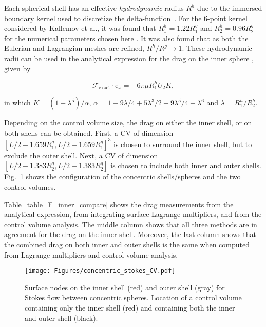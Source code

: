 \documentclass[review]{elsarticle}
\renewcommand{\vec}[1]{\bm{\mathrm{#1}}}
\def \e{\vec{e}}
\def \cF{\vec{\mathcal{F}}}
\def \e{\vec{e}}
\begin{document}
Each spherical shell has an effective \emph{hydrodynamic} radius $R^h$ due to the immersed
boundary kernel used to discretize the delta-function~\cite{Vazquez-Quesada14}.
For the 6-point kernel considered by Kallemov et al., it was found that $R_1^h = 1.22 R_1^g$
and $R_2^h = 0.96R_2^g$ for the numerical parameters chosen here \cite{Kallemov16}. It was
also found that as both the Eulerian and Lagrangian meshes are refined, $R^h/R^g \rightarrow
1$. These hydrodynamic radii can be used in the analytical expression for the drag on the 
inner sphere \cite{Happel65}, given by

\begin{equation}
\label{eq_analytical_concentric_sphere}
\cF_\textrm{exact} \cdot \e_x = -6 \pi \mu R_1^h U_2 K,
\end{equation} 

\noindent in which $K = (1-\lambda^5)/\alpha$, $\alpha = 1-9\lambda/4 + 5 \lambda^3/2
-9\lambda^5/4 + \lambda^6$ and $\lambda = R_1^h/R_2^h$.

Depending on the control volume size, the drag on either the inner shell, or on both
shells can be obtained. First, a CV of dimension $[L/2-1.659R_1^g,L/2+1.659R_1^g]^3$
is chosen to surround the inner shell, but to exclude the outer shell. Next, a CV of dimension
$[L/2-1.383R_2^g,L/2+1.383R_2^g]$ is chosen to include both inner and outer shells. Fig.~\ref{fig_concentric_stokes_CV} shows the configuration of the concentric shells/spheres and the
two control volumes.

Table~\ref{table_F_inner_compare} shows the drag measurements from the analytical
expression, from integrating surface Lagrange multipliers, and from the control volume
analysis. The middle column shows that all three methods are in agreement for the
drag on the inner shell. Moreover, the last column shows that the combined drag
on both inner and outer shells is the same when computed from Lagrange multipliers
and control volume analysis.

\begin{figure}[H]
  \centering
    \texttt{[image: Figures/concentric\_stokes\_CV.pdf]}
  \caption{Surface nodes on the inner shell (red) and outer shell (gray)
  for Stokes flow between concentric spheres.
  Location of a control volume containing only the inner shell (red) and
  containing both the inner and outer shell (black).}
  \label{fig_concentric_stokes_CV}
\end{figure}
\end{document}
